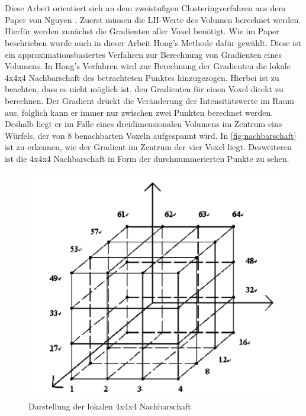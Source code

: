\chapter{}
\label{sec:methods}


Diese Arbeit orientiert sich an dem zweistufigen Clusteringverfahren aus dem Paper von Nguyen \cite{nguyen2012clustering}. 
\newline
Zuerst müssen die LH-Werte des Volumen berechnet werden. Hierfür werden zunächst die Gradienten aller Voxel benötigt. Wie im Paper beschrieben wurde auch in dieser Arbeit Hong's Methode \cite{hong2003method} dafür gewählt.
Diese ist ein approximationsbasiertes Verfahren zur Berechnung von Gradienten eines Volumens. 
\newline
In Hong's Verfahren wird zur Berechnung der Gradienten die lokale 4x4x4 Nachbarschaft des betrachteten Punktes hinzugezogen. Hierbei ist zu beachten, dass es nicht möglich ist, den Gradienten für einen Voxel direkt zu berechnen. Der Gradient drückt die Veränderung der Intensitätswerte im Raum aus, folglich kann er immer nur zwischen zwei Punkten berechnet werden. Deshalb liegt er im Falle eines dreidimensionalen Volumens im Zentrum eins Würfels, der von 8 benachbarten Voxeln aufgespannt wird. In \autoref{fig:nachbarschaft} ist zu erkennen, wie der Gradient im Zentrum der vier Voxel liegt. Desweiteren ist die 4x4x4 Nachbarschaft in Form der durchnummerierten Punkte zu sehen.
\newline

\begin{figure}[!h] 
\centering 
\includegraphics[width=\textwidth]{Logos/VoxelEdges.PNG}
\caption{Darstellung der lokalen 4x4x4 Nachbarschaft} 
\label{fig:nachbarschaft} 
\end{figure}




